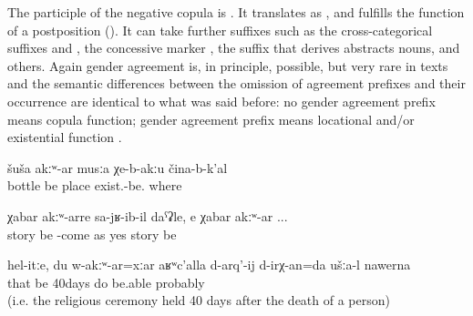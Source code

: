 The participle of the negative copula is . It translates as  ,  and fulfills the function of a postposition (). It can take further suffixes such as the cross-categorical suffixes  and , the concessive marker  , the suffix  that derives abstracts nouns, and others. Again gender agreement is, in principle, possible, but very rare in texts  and the semantic differences between the omission of agreement prefixes and their occurrence are identical to what was said before: no gender agreement prefix means copula function; gender agreement prefix means locational and/or existential function .
%
\begin{exe}
	\ex	\label{ex:There is no place without bottles}
	\gll	šuša	akːʷ-ar	musːa	χe-b-akːu	čina-b-k'al\\
		bottle	be	place	exist.-be.	where\\
	\glt	{}

	\ex	\label{ex:as if his arrival was unexpected (lit. without news), yes unexpected}
	\gll	χabar	akːʷ-arre	sa-jʁ-ib-il	daˁʡle,		e	χabar	akːʷ-ar ...\\
		story	be	-come	as	yes	story	be\\
	\glt	{}

	\ex	\label{ex:Well, you like this, even me not being there, should be able to do the 40 days, probably}
	\gll	hel-itːe,	du	w-akːʷ-ar=xːar	aʁʷc'alla	d-arq'-ij	d-irχ-an=da	ušːa-l		nawerna\\
		that		be	40days	do	be.able			probably\\
	\glt	{} (i.e. the religious ceremony held 40 days after the death of a person)
\end{exe}


